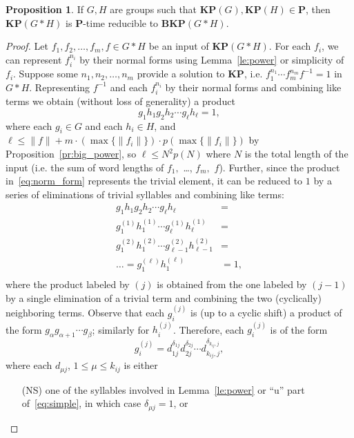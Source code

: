 \documentclass[10pt]{amsart}
\theoremstyle{definition}
\newtheorem{proposition}[theorem]{Proposition}
\def\P{{\mathbf{P}}}
\def\BKP{{\mathbf{BKP}}}
\def\KP{{\mathbf{KP}}}
\begin{document}
\begin{proposition}\label{pr:kp_to_bkp}
If $G,H$ are groups such that $\KP(G),\KP(H)\in\P$, then $\KP(G*H)$ is $\P$-time reducible to $\BKP(G*H)$.
\end{proposition}
\begin{proof}
Let $f_1,f_2,\ldots,f_m,f\in G*H$ be an input of $\KP(G*H)$. For each $f_i$, we can represent $f_i^{n_i}$ by their normal forms using Lemma~\ref{le:power} or simplicity of $f_i$. Suppose some $n_1,n_2,\ldots,n_m$ provide a solution to $\KP$, i.e. $f_1^{n_1}\cdots f_m^{n_m}f^{-1}=1$ in $G*H$. Representing $f^{-1}$ and each $f_i^{n_i}$ by their normal forms and combining like terms we obtain (without loss of generality) a product
\begin{equation}\label{eq:norm_form}
g_1h_1g_2h_2\cdots g_\ell h_\ell=1,
\end{equation}
where each $g_i\in G$ and each $h_i\in H$, and $\ell\le \|f\|+m\cdot (\max\{\|f_i\|\})\cdot p(\max\{\|f_i\|\})$ by Proposition~\ref{pr:big_power}, so $\ell\le N^2p(N)$ where $N$ is the total length of the input (i.e. the sum of word lengths of $f_1,$ \ldots, $f_m,$ $f$). Further, since the product in~\eqref{eq:norm_form} represents the trivial element, it can be reduced to $1$ by a series of eliminations of trivial syllables and combining like terms:
\begin{align*}
g_1h_1g_2h_2\cdots g_\ell h_\ell&=\\
g_1^{(1)}h_1^{(1)}\cdots g_\ell^{(1)}h_\ell^{(1)}&=\\
g_1^{(2)}h_1^{(2)}\cdots g_{\ell-1}^{(2)}h_{\ell-1}^{(2)}&=\\
\ldots=g_1^{(\ell)}h_1^{(\ell)}&=1,\\
\end{align*}
where the product labeled by $(j)$ is obtained from the one labeled by $(j-1)$ by a single elimination of a trivial term and combining the two (cyclically) neighboring terms. Observe that each $g_i^{(j)}$ is (up to a cyclic shift) a product of the form $g_\alpha g_{\alpha+1}\cdots g_\beta$; similarly for $h_i^{(j)}$. Therefore, each $g_i^{(j)}$ is of the form
\begin{equation}\label{eq:g_ij}
g_i^{(j)}=d_{1j}^{\delta_{1j}} d_{2j}^{\delta_{2j}}\cdots d_{k_{ij},j}^{\delta_{k_{ij},j}},
\end{equation}
where each $d_{\mu j}$, $1\le \mu\le k_{ij}$ is either
\begin{itemize}
\item[(NS)] one of the syllables involved in Lemma~\ref{le:power} or ``u'' part of~\eqref{eq:simple}, in which case $\delta_{\mu j}=1$, or

\end{itemize}
\end{proof}
\end{document}

